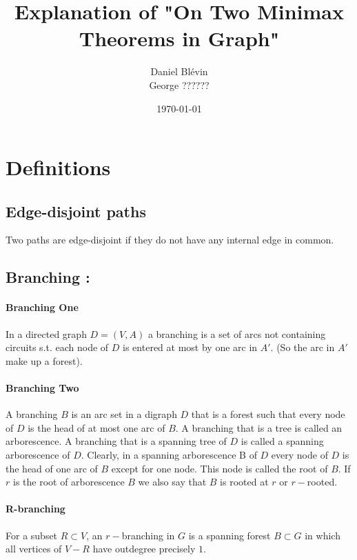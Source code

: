 \documentclass{article}
\title{Explanation of "On Two Minimax Theorems in Graph"}
\author{Daniel Blévin\\George ??????}
\date\today
\begin{document}
\maketitle
\newpage
\tableofcontents
\newpage
\newtheorem{edmonds_theorem}{THEOREM}

\section{Definitions}

\subsection{Edge-disjoint paths}
Two paths are edge-disjoint if they do not have any internal edge in common.

\subsection{Branching :}


\paragraph{Branching One}
In a directed graph $D = (V, A)$ a branching is a set of arcs not containing 
circuits s.t. each node of $D$ is entered at most by one arc in $A'$. 
(So the arc in $A'$ make up a forest). %

\paragraph{Branching Two} {
A branching $B$ is an arc set in a digraph $D$ that is a forest such that every node of $D$ 
is the head of at most one arc of $B$. 
A branching that is a tree is called an arborescence.
A branching that is a spanning tree of $D$ is called a spanning arborescence of $D$. 
Clearly, in a spanning arborescence B of $D$ every node of $D$ is the head of one arc of $B$ 
except for one node. 
This node is called the root of $B$. 
If $r$ is the root of arborescence $B$ we also say that $B$ is rooted at $r$ or $r-$rooted.
}

\paragraph{R-branching}
For a subset $R \subset V$, an $r-$branching in $G$ is a spanning forest $B \subset G$ in 
which all vertices of $V - R$ have outdegree precisely $1$.
\end{document}
